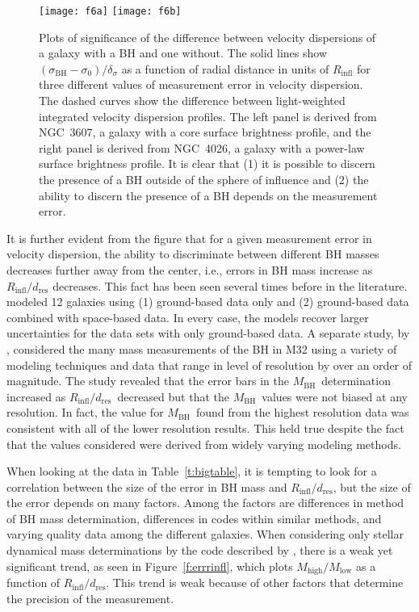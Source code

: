 \documentclass[twosided,letterpaper,numberedappendix]{emulateapj}
\newcommand{\mbh}      {\ensuremath{M_{\mathrm{BH}}}}
\newcommand{\rinfres} {\ensuremath{R_{\mathrm{infl}} / d_{\mathrm{res}}}}
\begin{document}
\begin{figure*}
\hspace{-0.75cm}\texttt{[image: f6a]}
\texttt{[image: f6b]}
\caption{Plots of significance of the difference between velocity
dispersions of a galaxy with a BH and one without.  The solid lines
show $(\sigma_\mathrm{BH} - \sigma_0) / \delta_\sigma$ as a function
of radial distance in units of $R_\mathrm{infl}$ for three different
values of measurement error in velocity dispersion.  The dashed curves
show the difference between light-weighted integrated velocity
dispersion profiles.  The left panel is derived from NGC~3607, a
galaxy with a core surface brightness profile, and the right panel is
derived from NGC~4026, a galaxy with a power-law surface brightness
profile.  It is clear that (1) it is possible to discern the presence
of a BH outside of the sphere of influence and (2) the ability to
discern the presence of a BH depends on the measurement error.}
\label{f:showrinfl}
\end{figure*}


It is further evident from the figure that for a given measurement
error in velocity dispersion, the ability to discriminate between
different BH masses decreases further away from the center, i.e.,
errors in BH mass increase as $\rinfres$ decreases.  This fact has
been seen several times before in the literature.
\citet{2003ApJ...583...92G} modeled 12 galaxies using (1) ground-based
data only and (2) ground-based data combined with space-based data.
In every case, the models recover larger uncertainties for the data
sets with only ground-based data.  A separate study, by
\citet{kormendy04}, considered the many mass measurements of the BH in
M32 using a variety of modeling techniques and data that range in
level of resolution by over an order of magnitude.  The study revealed
that the error bars in the \mbh\ determination increased as \rinfres\
decreased but that the \mbh\ values were not biased at any resolution.
In fact, the value for \mbh\ found from the highest resolution data
was consistent with all of the lower resolution results.  This held
true despite the fact that the values considered were derived from
widely varying modeling methods.

When looking at the data in Table~\ref{t:bigtable}, it is tempting to
look for a correlation between the size of the error in BH mass and
$\rinfres$, but the size of the error depends on many factors.  Among
the factors are differences in method of BH mass determination,
differences in codes within similar methods, and varying quality data
among the different galaxies.  When considering only stellar dynamical
mass determinations by the code described by \citet{siopisetal08},
there is a weak yet significant trend, as seen in
Figure~\ref{f:errrinfl}, which plots $M_\mathrm{high} /
M_\mathrm{low}$ as a function of $\rinfres$.  This trend is weak
because of other factors that determine the precision of the
measurement.
\end{document}
